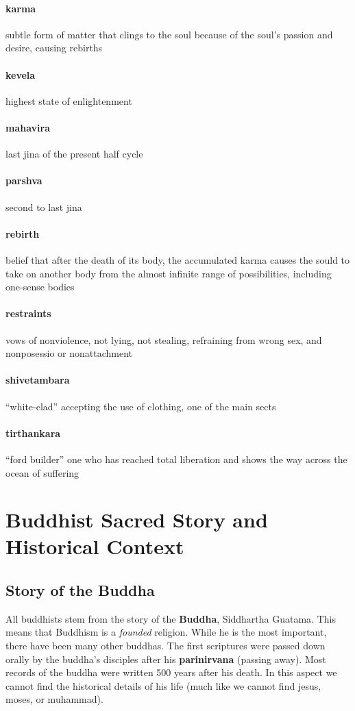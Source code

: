 \documentclass{article}
\begin{document}
\paragraph{karma}
\label{par:karma}
subtle form of matter that clings to the soul because of the soul's passion and desire, causing rebirths
\paragraph{kevela}
\label{par:kevela}
highest state of enlightenment
\paragraph{mahavira}
\label{par:mahavira}
last jina of the present half cycle
\paragraph{parshva}
\label{par:parshva}
second to last jina
\paragraph{rebirth}
\label{par:rebirth}
belief that after the death of its body, the accumulated karma causes the sould to take on another body from the almost infinite range of possibilities, including one-sense bodies
\paragraph{restraints}
\label{par:restraints}
vows of nonviolence, not lying, not stealing, refraining from wrong sex, and nonposessio or nonattachment
\paragraph{shivetambara}
\label{par:shivetambara}
``white-clad'' accepting the use of clothing, one of the main sects
\paragraph{tirthankara}
\label{par:tirthankara}
``ford builder'' one who has reached total liberation and shows the way across the ocean of suffering

\section{Buddhist Sacred Story and Historical Context}
\label{sec:buddhist_sacred_story_and_historical_context}
\subsection{Story of the Buddha}
\label{sub:story_of_the_buddha}
All buddhists stem from the story of the \textbf{Buddha}, Siddhartha Guatama. This means that Buddhism is a \emph{founded} religion. While he is the most important, there have been many other buddhas. The first scriptures were passed down orally by the buddha's disciples after his \textbf{parinirvana} (passing away). Most records of the buddha were written 500 years after his death. In this aspect we cannot find the historical details of his life (much like we cannot find jesus, moses, or muhammad).
\end{document}
